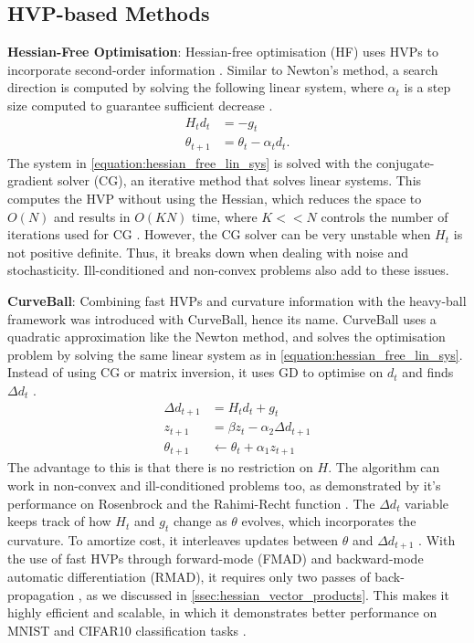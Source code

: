 \subsection{HVP-based Methods}
\label{ssec:hvp_based_methods}

\textbf{Hessian-Free Optimisation}: Hessian-free optimisation (HF) uses HVPs to incorporate second-order information \citep{NoceWrig06, martens2010hessianfree}. Similar to Newton's method, a search direction is computed by solving the following linear system, where $\alpha_t$ is a step size computed to guarantee sufficient decrease \citep{martens2010hessianfree}.
\begin{align}
    H_t d_t &= - g_t \\
    \theta_{t+1} &= \theta_t - \alpha_t d_t.
    \label{equation:hessian_free_lin_sys}
\end{align}
The system in \cref{equation:hessian_free_lin_sys} is solved with the conjugate-gradient solver (CG), an iterative method that solves linear systems. This computes the HVP without using the Hessian, which reduces the space to $O(N)$ and results in $O(KN)$ time, where $K << N$ controls the number of iterations used for CG \citep{martens2010hessianfree}. However, the CG solver can be very unstable when $H_t$ is not positive definite. Thus, it breaks down when dealing with noise and stochasticity. Ill-conditioned and non-convex problems also add to these issues.

\textbf{CurveBall}: Combining fast HVPs and curvature information with the heavy-ball framework was introduced with CurveBall, hence its name. CurveBall uses a quadratic approximation like the Newton method, and solves the optimisation problem by solving the same linear system as in \cref{equation:hessian_free_lin_sys}. Instead of using CG or matrix inversion, it uses GD to optimise on $d_t$ and finds $\Delta d_t$ \cite{henriques2019small}. 
\begin{align}
    \Delta d_{t+1} &= H_t d_t + g_t \\
    z_{t+1} &= \beta z_{t} - \alpha_2 \Delta d_{t+1} \\
    \theta_{t+1} &\leftarrow \theta_t + \alpha_1 z_{t+1}
\end{align}
The advantage to this is that there is no restriction on $H$. The algorithm can work in non-convex and ill-conditioned problems too, as demonstrated by it's performance on Rosenbrock and the Rahimi-Recht function \citep{henriques2019small}. The $\Delta d_{t}$ variable keeps track of how $H_t$ and $g_t$ change as $\theta$ evolves, which incorporates the curvature. To amortize cost, it interleaves updates between $\theta$ and $\Delta d_{t+1}$ \citep{henriques2019small}. With the use of fast HVPs through forward-mode (FMAD) and backward-mode automatic differentiation (RMAD), it requires only two passes of back-propagation \citep{henriques2019small}, as we discussed in \cref{ssec:hessian_vector_products}. This makes it highly efficient and scalable, in which it demonstrates better performance on MNIST and CIFAR10 classification tasks \citep{henriques2019small}.  

